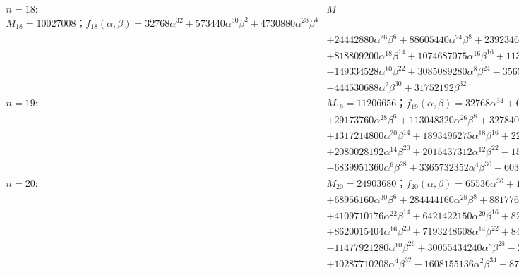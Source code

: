 \begin{flushleft}
\begin{align*}
n=18:&M\\ M_{18}=10027008；f_{18}(\alpha,\beta)=32768\alpha^{32}+573440\alpha^{30}\beta^2+4730880\alpha^{28}\beta^4\\ 
&+24442880\alpha^{26}\beta^6+88605440\alpha^{24}\beta^{8}+239234688\alpha^{22}\beta^{10}+498405600\alpha^{20}\beta^{12}\\ 
&+818809200\alpha^{18}\beta^{14}+1074687075\alpha^{16}\beta^{16}+1132428880\alpha^{14}\beta^{18}+1047367552\alpha^{12}\beta^{20}\\ 
&-149334528\alpha^{10}\beta^{22}+3085089280\alpha^8\beta^{24}-3565506560\alpha^6\beta^{26}+2143272960\alpha^4\beta^{28}\\ 
&-444530688\alpha^2\beta^{30}+31752192\beta^{32}\\ 
n=19:&M_{19}=11206656；f_{19}(\alpha,\beta)=32768\alpha^{34}+606208\alpha^{32}\beta^2+5304320\alpha^{30}\beta^4\\ 
&+29173760\alpha^{28}\beta^6+113048320\alpha^{26}\beta^{8}+327840128\alpha^{24}\beta^{10}+737640288\alpha^{22}\beta^{12}\\ 
&+1317214800\alpha^{20}\beta^{14}+1893496275\alpha^{18}\beta^{16}+2209194460\alpha^{16}\beta^{18}\\ 
&+2080028192\alpha^{14}\beta^{20}+2015437312\alpha^{12}\beta^{22}-1533862400\alpha^{10}\beta^{24}+6968944640\alpha^8\beta^{26}\\ &-6839951360\alpha^6\beta^{28}+3365732352\alpha^4\beta^{30}-603291648\alpha^2\beta^{32}+37355520\beta^{34}\\
n=20:&M_{20}=24903680；f_{20}(\alpha,\beta)=65536\alpha^{36}+1277952\alpha^{34}\beta^2+11821056\alpha^{32}\beta^4\\ 
&+68956160\alpha^{30}\beta^6+284444160\alpha^{28}\beta^{8}+881776896\alpha^{26}\beta^{10}+2130960832\alpha^{24}\beta^{12}\\ 
&+4109710176\alpha^{22}\beta^{14}+6421422150\alpha^{20}\beta^{16}+8205150525\alpha^{18}\beta^{18}\\ 
&+8620015404\alpha^{16}\beta^{20}+7193248608\alpha^{14}\beta^{22}+8412511744\alpha^{12}\beta^{24}\\ 
&-11477921280\alpha^{10}\beta^{26}+30055434240\alpha^8\beta^{28}-25007497216\alpha^6\beta^{30}\\ &+10287710208\alpha^4\beta^{32}-1608155136\alpha^2\beta^{34}+87162880\beta^{36}\\
\end{align*}
\end{flushleft}
\newpage

